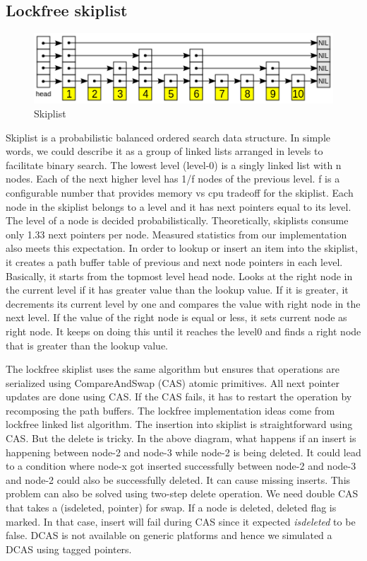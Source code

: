 \documentclass{vldb}
\begin{document}
\subsection{Lockfree skiplist}

\begin{figure}[h]
\includegraphics[scale=0.5]{images/fig-2}
\caption{Skiplist}
\label{fig:skiplist}
\end{figure}
Skiplist\cite{maurice:art-of-multproc} is a probabilistic balanced ordered search data structure. In simple words, we could describe it as a group of linked lists arranged in levels to facilitate binary search. The lowest level (level-0) is a singly linked list with n nodes. Each of the next higher level has 1/f nodes of the previous level. f is a configurable number that provides memory vs cpu tradeoff for the skiplist. Each node in the skiplist belongs to a level and it has next pointers equal to its level. The level of a node is decided probabilistically. Theoretically, skiplists consume only 1.33 next pointers per node. Measured statistics from our implementation also meets this expectation. In order to lookup or insert an item into the skiplist, it creates a path buffer table of previous and next node pointers in each level. Basically, it starts from the topmost level head node. Looks at the right node in the current level if it has greater value than the lookup value. If it is greater, it decrements its current level by one and compares the value with right node in the next level. If the value of the right node is equal or less, it sets current node as right node. It keeps on doing this until it reaches the level0 and finds a right node that is greater than the lookup value. 


The lockfree skiplist\cite{pugh:skiplist} uses the same algorithm but ensures that operations are serialized using CompareAndSwap (CAS) atomic primitives. All next pointer updates are done using CAS. If the CAS fails, it has to restart the operation by recomposing the path buffers. The lockfree implementation ideas come from lockfree linked list algorithm\cite{valois:lockfree-list}. The insertion into skiplist is straightforward using CAS. But the delete is tricky. In the above diagram, what happens if an insert is happening between node-2 and node-3 while node-2 is being deleted. It could lead to a condition where node-x got inserted successfully between node-2 and node-3 and node-2 could also be successfully deleted. It can cause missing inserts. This problem can also be solved using two-step delete operation.
 We need double CAS that takes a (isdeleted, pointer) for swap. If a node is deleted, deleted flag is marked.  In that case, insert will fail during CAS since it expected \textit{isdeleted} to be false. DCAS is not available on generic platforms and hence we simulated a DCAS using tagged pointers.
 
\end{document}
